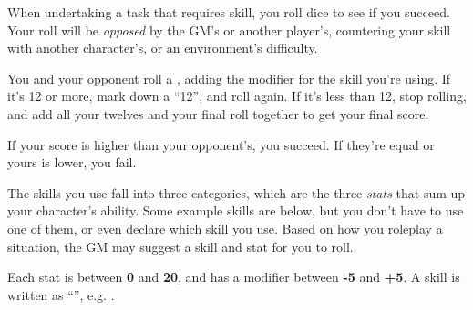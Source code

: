 
When undertaking a task that requires skill, you roll dice to see if you succeed. Your roll will be \emph{opposed} by the GM's or another player's, countering your skill with another character's, or an environment's difficulty.

You and your opponent roll a , adding the modifier for the skill you're using. If it's 12 or more, mark down a ``12'', and roll again. If it’s less than 12, stop rolling, and add all your twelves and your final roll together to get your final score.

If your score is higher than your opponent's, you succeed. If they're equal or yours is lower, you fail.

The skills you use fall into three categories, which are the three \emph{stats} that sum up your character's ability. Some example skills are below, but you don't have to use one of them, or even declare which skill you use. Based on how you roleplay a situation, the GM may suggest a skill and stat for you to roll.



Each stat is between \textbf{0} and \textbf{20}, and has a modifier between \textbf{-5} and \textbf{+5}. A skill is written as ``'', e.g. .
